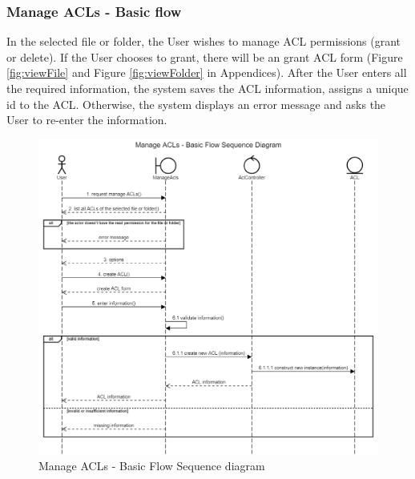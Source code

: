 \subsubsection{Manage ACLs - Basic flow}
In the selected file or folder, the User wishes to manage ACL permissions (grant or delete). If the User chooses to grant, there will be an grant ACL form (Figure \ref{fig:viewFile} and Figure \ref{fig:viewFolder} in Appendices). After the User enters all the required information, the system saves the ACL information, assigns a unique id to the ACL. Otherwise, the system displays an error message and asks the User to re-enter the information. 
\begin{figure}[H]
    \centering
    \includegraphics[width=1.0\textwidth]{images/Manage ACLs - Basic Flow Sequence Diagram.png}
    \caption{Manage ACLs - Basic Flow Sequence diagram}
    \label{fig:SeqACLsBasic}
\end{figure}
